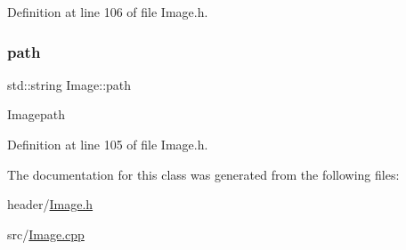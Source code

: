 Definition at line 106 of file Image.\+h.

\mbox{\label{classImage_aec8a33f176362d146da8c058798ebbff}} 
\subsubsection{\texorpdfstring{path}{path}}
{\footnotesize\ttfamily std\+::string Image\+::path\hspace{0.3cm}{\ttfamily [private]}}

Imagepath 

Definition at line 105 of file Image.\+h.



The documentation for this class was generated from the following files\+:\begin{DoxyCompactItemize}
\item 
header/\mbox{\hyperlink{Image_8h}{Image.\+h}}\item 
src/\mbox{\hyperlink{Image_8cpp}{Image.\+cpp}}\end{DoxyCompactItemize}
